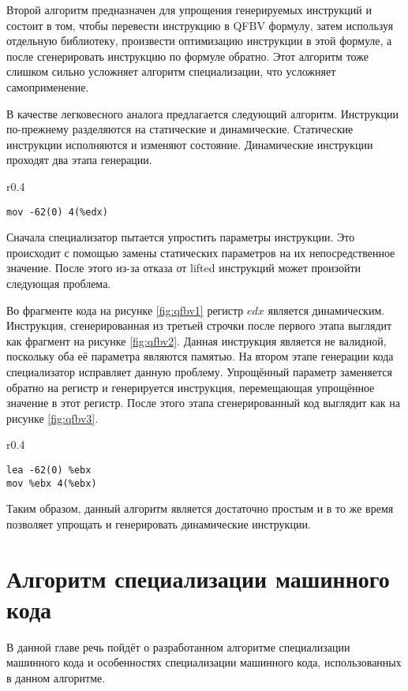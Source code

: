 \documentclass{spbau-diploma}
\begin{document}
Второй алгоритм предназначен для упрощения генерируемых инструкций и состоит в том, чтобы перевести инструкцию в QFBV формулу, затем используя отдельную библиотеку, произвести оптимизацию инструкции в этой формуле, а после сгенерировать инструкцию по формуле обратно. Этот алгоритм тоже слишком сильно усложняет алгоритм специализации, что усложняет самоприменение.

В качестве легковесного аналога предлагается следующий алгоритм. Инструкции по-прежнему разделяются на статические и динамические. Статические инструкции исполняются и изменяют состояние. Динамические инструкции проходят два этапа генерации. \begin{wrapfigure}{r}{0.4\textwidth}
\begin{lstlisting}[xleftmargin = 20pt]
mov -62(0) 4(%edx)
\end{lstlisting}
\caption{Фрагмент кода}
\label{fig:qfbv2}
\end{wrapfigure}Сначала специализатор пытается упростить параметры инструкции. Это происходит с помощью замены статических параметров на их непосредственное значение. После этого из-за отказа от lifted инструкций может произойти следующая проблема. 

Во фрагменте кода на рисунке \ref{fig:qfbv1} регистр $edx$ является динамическим. Инструкция, сгенерированная из третьей строчки после первого этапа выглядит как фрагмент на рисунке \ref{fig:qfbv2}. 
Данная инструкция является не валидной, поскольку оба её параметра являются памятью. На втором этапе генерации кода специализатор исправляет данную проблему. Упрощённый параметр заменяется обратно на регистр и генерируется инструкция, перемещающая упрощённое значение в этот регистр. После этого этапа сгенерированный код выглядит как на рисунке \ref{fig:qfbv3}.

\begin{wrapfigure}{r}{0.4\textwidth}
\begin{lstlisting}[xleftmargin = 20pt]
lea -62(0) %ebx 
mov %ebx 4(%ebx)
\end{lstlisting}
\caption{Фрагмент кода}
\label{fig:qfbv3}
\end{wrapfigure}
Таким образом, данный алгоритм является достаточно простым и в то же время позволяет упрощать и генерировать динамические инструкции.

\section{ Алгоритм специализации машинного кода}
В данной главе речь пойдёт о разработанном алгоритме специализации машинного кода и особенностях специализации машинного кода, использованных в данном алгоритме.
\end{document}
